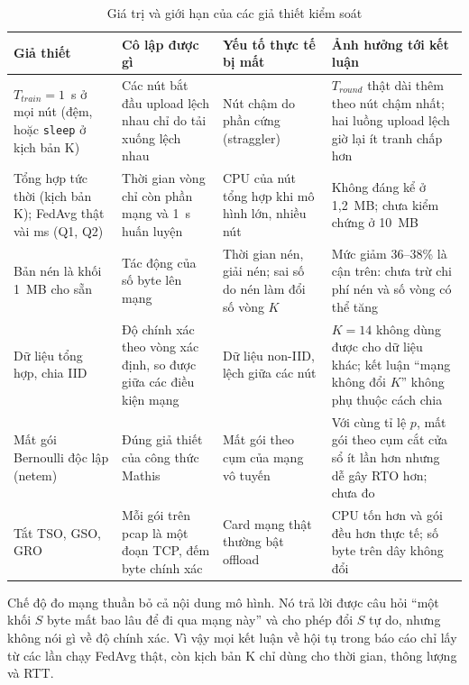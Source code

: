 \begin{table}[H]
    \centering
    \caption{Giá trị và giới hạn của các giả thiết kiểm soát}
    \label{tab:assume}
    \small
    \begin{tabularx}{\textwidth}{>{\raggedright\arraybackslash}p{2.9cm} >{\raggedright\arraybackslash}X >{\raggedright\arraybackslash}X >{\raggedright\arraybackslash}X}
        \toprule
        \textbf{Giả thiết} & \textbf{Cô lập được gì} & \textbf{Yếu tố thực tế bị mất} & \textbf{Ảnh hưởng tới kết luận} \\
        \midrule
        $T_{train} = 1$~s ở mọi nút (đệm, hoặc \texttt{sleep} ở kịch bản K) & Các nút bắt đầu upload lệch nhau chỉ do tải xuống lệch nhau & Nút chậm do phần cứng (straggler) & $T_{round}$ thật dài thêm theo nút chậm nhất; hai luồng upload lệch giờ lại ít tranh chấp hơn \\
        \midrule
        Tổng hợp tức thời (kịch bản K); FedAvg thật vài ms (Q1, Q2) & Thời gian vòng chỉ còn phần mạng và 1~s huấn luyện & CPU của nút tổng hợp khi mô hình lớn, nhiều nút & Không đáng kể ở 1{,}2~MB; chưa kiểm chứng ở 10~MB \\
        \midrule
        Bản nén là khối 1~MB cho sẵn & Tác động của số byte lên mạng & Thời gian nén, giải nén; sai số do nén làm đổi số vòng $K$ & Mức giảm 36--38\% là cận trên: chưa trừ chi phí nén và số vòng có thể tăng \\
        \midrule
        Dữ liệu tổng hợp, chia IID & Độ chính xác theo vòng xác định, so được giữa các điều kiện mạng & Dữ liệu non-IID, lệch giữa các nút & $K = 14$ không dùng được cho dữ liệu khác; kết luận ``mạng không đổi $K$'' không phụ thuộc cách chia \\
        \midrule
        Mất gói Bernoulli độc lập (netem) & Đúng giả thiết của công thức Mathis & Mất gói theo cụm của mạng vô tuyến & Với cùng tỉ lệ $p$, mất gói theo cụm cắt cửa sổ ít lần hơn nhưng dễ gây RTO hơn; chưa đo \\
        \midrule
        Tắt TSO, GSO, GRO & Mỗi gói trên pcap là một đoạn TCP, đếm byte chính xác & Card mạng thật thường bật offload & CPU tốn hơn và gói đều hơn thực tế; số byte trên dây không đổi \\
        \bottomrule
    \end{tabularx}
\end{table}

Chế độ đo mạng thuần bỏ cả nội dung mô hình. Nó trả lời được câu hỏi ``một khối $S$ byte mất bao lâu để đi qua mạng này'' và cho phép đổi $S$ tự do, nhưng không nói gì về độ chính xác. Vì vậy mọi kết luận về hội tụ trong báo cáo chỉ lấy từ các lần chạy FedAvg thật, còn kịch bản K chỉ dùng cho thời gian, thông lượng và RTT.


